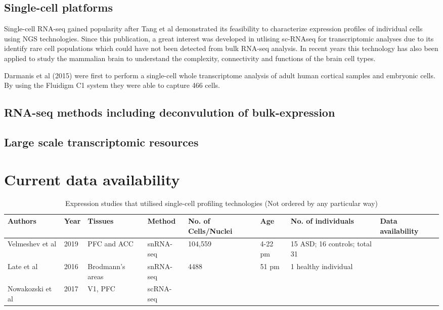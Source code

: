 \documentclass[12pt]{article}
\begin{document}
\subsection{Single-cell platforms}
Single-cell RNA-seq gained popularity after Tang et al demonstrated its feasibility to characterize expression profiles of individual cells using NGS technologies. Since this publication, a great interest was developed in utlising sc-RNAseq for transcriptomic analyses due to its identify rare cell populations which could have not been detected from bulk RNA-seq analysis.  In recent years this technology has also been applied to study the mammalian brain to understand the complexity, connectivity and functions of the brain cell types. 

Darmanis et al (2015) were first to perform a single-cell whole transcriptome analysis of adult human cortical samples and embryonic cells. By using the Fluidigm C1 system they were able to capture 466 cells. 

 

\subsection{RNA-seq methods including deconvulution of bulk-expression}

\subsection{Large scale transcriptomic resources}



\section{Current data availability}

\begin{landscape}
	\begin{table}[!htp]
		\centering
		\footnotesize
		\caption{Expression studies that utilised single-cell profiling technologies (Not ordered by any particular way)}
		\begin{tabular}{|l|l|l|l|l|l|l|l|}
			\hline
			\textbf{Authors} &\textbf{Year}  & \textbf{Tissues} & \textbf{Method} & \textbf{No. of Cells/Nuclei}  & \textbf{Age} &  \textbf{No. of individuals} & \textbf{Data availability}  \\ \hline
			Velmeshev et al & 2019  &  PFC and ACC  & snRNA-seq  & 104,559 & 4-22 pm &15 ASD; 16 controls; total 31&  \\ \hline
			Late et al& 2016  & Brodmann's areas  & snRNA-seq & 4488 &51 pm & 1 healthy individual &  \\ \hline
			Nowakozski et al & 2017 &V1, PFC & scRNA-seq     & &&& \\ \hline
		\end{tabular}
	\end{table}
\end{landscape}
\end{document}
